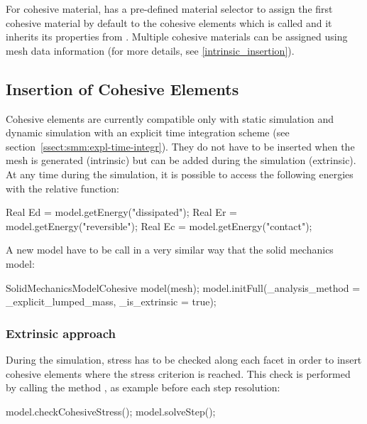 For cohesive material, \akantu has a pre-defined material selector to
assign the first cohesive material by default to the cohesive elements
which is called
 and it inherits its properties from 
. Multiple cohesive materials can be assigned 
using mesh data information (for more details,
see \ref{intrinsic_insertion}).

\subsection{Insertion of Cohesive Elements}
Cohesive elements are currently compatible only with static simulation
and dynamic simulation with an explicit time integration scheme (see
section~\ref{ssect:smm:expl-time-integr}). They do not have to be
inserted when the mesh is generated (intrinsic) but can be added
during the simulation (extrinsic). At any time during the simulation,
it is possible to access the following energies with the relative
function:
\begin{cpp}
  Real Ed = model.getEnergy("dissipated");
  Real Er = model.getEnergy("reversible");
  Real Ec = model.getEnergy("contact");
\end{cpp}

A new model have to be call in a very similar way that the solid
mechanics model:
\begin{cpp}
  SolidMechanicsModelCohesive model(mesh);
  model.initFull(_analysis_method = _explicit_lumped_mass,
                 _is_extrinsic = true);
\end{cpp} 


\subsubsection{Extrinsic approach \label{extrinsic_insertion}}
During the simulation, stress has to be checked along each facet in
order to insert cohesive elements where the stress criterion is
reached.  This check is performed by calling the
method , as example before each step
resolution:
\begin{cpp}
  model.checkCohesiveStress();
  model.solveStep();
\end{cpp}


